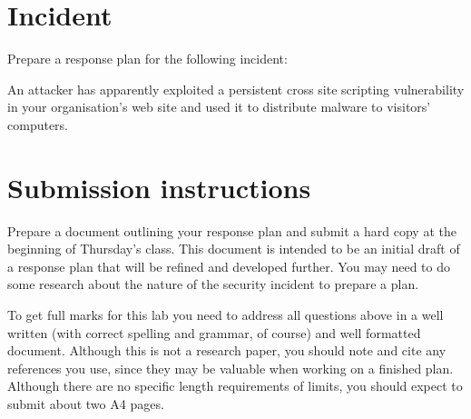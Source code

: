 \documentclass{article}
\begin{document}
\newpage 

\section{Incident}
Prepare a response plan for the following incident:

An attacker has apparently exploited a persistent cross site scripting vulnerability in your organisation's web site and used it to distribute malware to visitors' computers.

\section{Submission instructions}
Prepare a document outlining your response plan and submit a hard copy at the beginning of Thursday's class.  This document is intended to be an initial draft of a response plan that will be refined and developed further.  You may need to do some research about the nature of the security incident to prepare a plan.

To get full marks for this lab you need to address all questions above in a well written (with correct spelling and grammar, of course) and well formatted document. Although this is not a research paper, you should note and cite any references you use, since they may be valuable when working on a finished plan. Although there are no specific length requirements of limits, you should expect to submit about two A4 pages.
 
\end{document}
